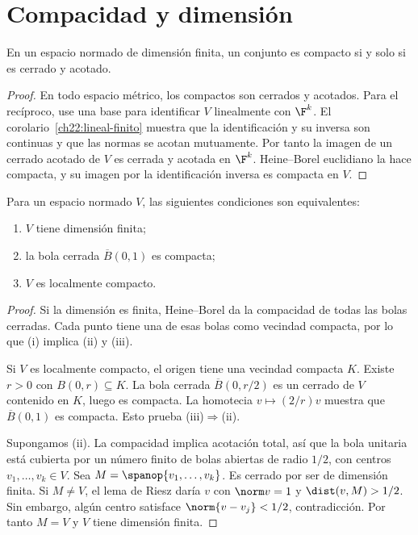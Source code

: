 \section{Compacidad y dimensión}

\begin{teorema}\label{ch22:heine-borel}
En un espacio normado de dimensión finita, un conjunto es compacto si y solo si es cerrado y acotado.
\end{teorema}
\begin{proof}
En todo espacio métrico, los compactos son cerrados y acotados. Para el recíproco, use una base para identificar $V$ linealmente con $\F^k$. El corolario~\ref{ch22:lineal-finito} muestra que la identificación y su inversa son continuas y que las normas se acotan mutuamente. Por tanto la imagen de un cerrado acotado de $V$ es cerrada y acotada en $\F^k$. Heine--Borel euclidiano la hace compacta, y su imagen por la identificación inversa es compacta en $V$.
\end{proof}

\begin{teorema}\label{ch22:caracterizacion}
Para un espacio normado $V$, las siguientes condiciones son equivalentes:
\begin{enumerate}[label=(\roman*)]
\item $V$ tiene dimensión finita;
\item la bola cerrada $\overline B(0,1)$ es compacta;
\item $V$ es localmente compacto.
\end{enumerate}
\end{teorema}
\begin{proof}
Si la dimensión es finita, Heine--Borel da la compacidad de todas las bolas cerradas. Cada punto tiene una de esas bolas como vecindad compacta, por lo que (i) implica (ii) y (iii).

Si $V$ es localmente compacto, el origen tiene una vecindad compacta $K$. Existe $r>0$ con $B(0,r)\subseteq K$. La bola cerrada $\overline B(0,r/2)$ es un cerrado de $V$ contenido en $K$, luego es compacta. La homotecia $v\mapsto (2/r)v$ muestra que $\overline B(0,1)$ es compacta. Esto prueba (iii)$\Rightarrow$(ii).

Supongamos (ii). La compacidad implica acotación total, así que la bola unitaria está cubierta por un número finito de bolas abiertas de radio $1/2$, con centros $v_1,\ldots,v_k\in V$. Sea $M=\spanop\{v_1,\ldots,v_k\}$. Es cerrado por ser de dimensión finita. Si $M\ne V$, el lema de Riesz daría $v$ con $\norm v=1$ y $\dist(v,M)>1/2$. Sin embargo, algún centro satisface $\norm{v-v_j}<1/2$, contradicción. Por tanto $M=V$ y $V$ tiene dimensión finita.
\end{proof}

